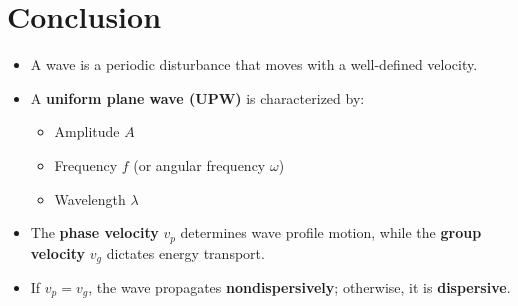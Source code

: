 \documentclass{article}
\begin{document}
\section{Conclusion}
\begin{itemize}
    \item A wave is a periodic disturbance that moves with a well-defined velocity.
    \item A \textbf{uniform plane wave (UPW)} is characterized by:
    \begin{itemize}
        \item Amplitude \( A \)
        \item Frequency \( f \) (or angular frequency \( \omega \))
        \item Wavelength \( \lambda \)
    \end{itemize}
    \item The \textbf{phase velocity} \( v_p \) determines wave profile motion, while the \textbf{group velocity} \( v_g \) dictates energy transport.
    \item If \( v_p = v_g \), the wave propagates \textbf{nondispersively}; otherwise, it is \textbf{dispersive}.
\end{itemize}
\end{document}
